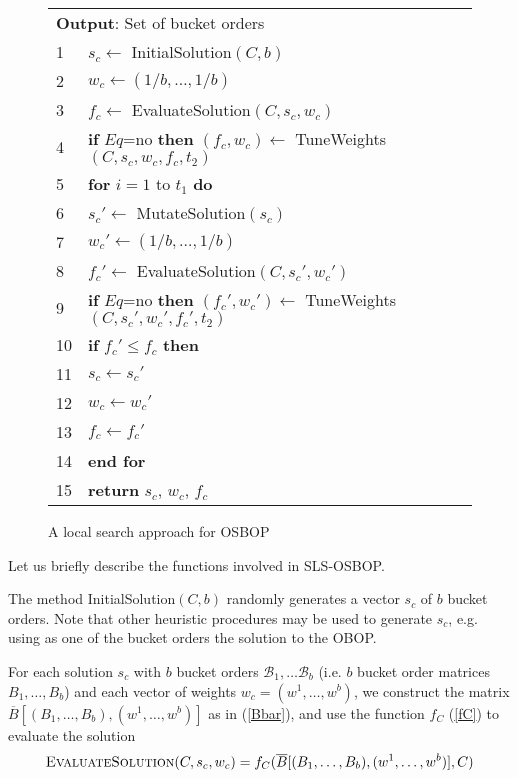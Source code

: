 \documentclass[preprint,12pt]{article}
\theoremstyle{definition}
\theoremstyle{remark}
\theoremstyle{example} %
\begin{document}
\begin{figure}[htbp]
\begin{tabular}{ll}
\multicolumn{2}{l}{{\bf Output}: Set of bucket orders}\\
1&  $s_c \leftarrow$ {\sc InitialSolution}$(C,b)$ \\
2&  $w_c \leftarrow (1/b,\dots,1/b)$ \\
3&  $f_c \leftarrow$ {\sc EvaluateSolution}$(C,s_c,w_c)$ \\
4 & \textbf{if} $Eq$=no  \textbf{then} $(f_c,w_c) \leftarrow$ {\sc TuneWeights}$(C,s_c,w_c,f_c,t_2)$   \\
5 & \textbf{for} $i=1$ to $t_1$ \textbf{do} \\
6 & \hspace{0.5cm} $s_c' \leftarrow$ {\sc MutateSolution}$(s_c)$ \\
7&  \hspace{0.5cm} $w_c' \leftarrow (1/b,\dots,1/b)$ \\
8&  \hspace{0.5cm} $f_c' \leftarrow$ {\sc EvaluateSolution}$(C,s_c',w_c')$ \\
9 & \hspace{0.5cm} \textbf{if} $Eq$=no  \textbf{then} $(f_c',w_c') \leftarrow$    {\sc TuneWeights}$(C,s_c',w_c',f_c',t_2)$ \\
10 & \hspace{0.5cm} \textbf{if} $f_c' \leq f_c$ \textbf{then} \\
11 & \hspace{1.0cm} $s_c \leftarrow s_c'$  \\
12 & \hspace{1.0cm} $w_c \leftarrow w_c'$  \\
13 & \hspace{1.0cm} $f_c \leftarrow f_c'$  \\
14 & \textbf{end for} \\
15 & \textbf{return} $s_c$, $w_c$, $f_c$ \\ \hline
\end{tabular}
\caption{A local search approach for OSBOP}
\label{fig:lsobopf}
\end{figure}

Let us briefly describe the functions involved in SLS-OSBOP.

The method {\sc InitialSolution}$(C,b)$ randomly generates a vector $s_c$ of $b$ bucket orders. 
Note that other heuristic procedures may be used to generate $s_c$, e.g. using as one of the bucket orders the solution to the OBOP. 



For each solution $s_c$ with $b$ bucket orders $\mathcal{B}_1,\dots \mathcal{B}_b$ (i.e. $b$ bucket order matrices $B_1,\dots,B_b$)  and each vector of weights $w_c=(w^1,\dots,w^b)$, we construct the  matrix $ \overline{B}[(B_1,\dots,B_b),(w^1,\dots,w^b)]$ as in (\ref{Bbar}), and use the function $f_C$ (\ref{fC}) to evaluate the solution
\begin{equation}\label{ES}
\text{{\sc EvaluateSolution}}(C,s_c,w_c)=f_C( \overline{B}[(B_1,\dots,B_b),(w^1,\dots,w^b)],C)
\end{equation}
\end{document}
